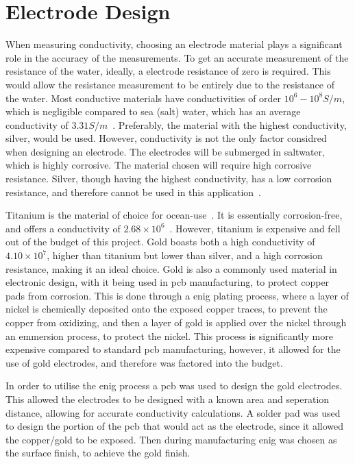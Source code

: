 \section{Electrode Design}\label{sec:electrode_design}
When measuring conductivity, choosing an electrode material plays a significant role in the accuracy of the measurements.
To get an accurate measurement of the resistance of the water, ideally, a electrode resistance of zero is required.
This would allow the resistance measurement to be entirely due to the resistance of the water.
Most conductive materials have conductivities of order $10^6 - 10^8 S/m$, which is negligible compared to sea (salt) water, which has an average conductivity of $3.31 S/m$~\cite{conductivities}\cite{ocean_conductivity_tyler}.
Preferably, the material with the highest conductivity, silver, would be used. However, conductivity is not the only factor considred when designing an electrode. 
The electrodes will be submerged in saltwater, which is highly corrosive. The material chosen will require high corrosive resistance. 
Silver, though having the highest conductivity, has a low corrosion resistance, and therefore cannot be used in this application~\cite{zhang_silver}.

Titanium is the material of choice for ocean-use~\cite{materials_ocean_structures}. It is essentially corrosion-free, and offers a conductivity of $2.68\times 10^{6}$~\cite{conductivities}.
However, titanium is expensive and fell out of the budget of this project.
Gold boasts both a high conductivity of $4.10\times 10^{7}$, higher than titanium but lower than silver, and a high corrosion resistance, making it an ideal choice.
Gold is also a commonly used material in electronic design, with it being used in \gls{pcb} manufacturing, to protect copper pads from corrosion.
This is done through a \gls{enig} plating process, where a layer of nickel is chemically deposited onto the exposed copper traces, to prevent the copper from oxidizing, and then a layer of gold is applied over the nickel through an emmersion process, to protect the nickel.
This process is significantly more expensive compared to standard \gls{pcb} manufacturing, however, it allowed for the use of gold electrodes, and therefore was factored into the budget. 

In order to utilise the \gls{enig} process a \gls{pcb} was used to design the gold electrodes.
This allowed the electrodes to be designed with a known area and seperation distance, allowing for accurate conductivity calculations.
A solder pad was used to design the portion of the \gls{pcb} that would act as the electrode, since it allowed the copper/gold to be exposed.
Then during manufacturing \gls{enig} was chosen as the surface finish, to achieve the gold finish.

